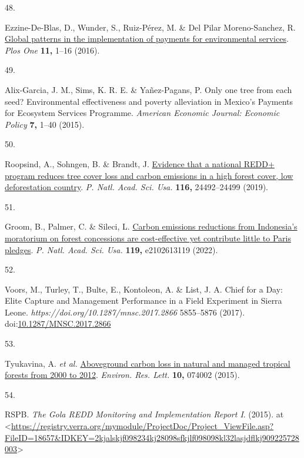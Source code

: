 \documentclass[
]{article}
\newlength{\cslhangindent}
\newlength{\csllabelwidth}
\newlength{\cslentryspacingunit} %
\newenvironment{CSLReferences}[2] %
 {%
  \setlength{\parindent}{0pt}
  \ifodd #1
  \let\oldpar\par
  \def\par{\hangindent=\cslhangindent\oldpar}
  \fi
  \setlength{\parskip}{#2\cslentryspacingunit}
 }%
 {}
\newcommand{\CSLLeftMargin}[1]{\parbox[t]{\csllabelwidth}{#1}}
\newcommand{\CSLRightInline}[1]{\parbox[t]{\linewidth - \csllabelwidth}{#1}\break}
\begin{document}
\begin{CSLReferences}{0}{0}
\leavevmode{}%
\CSLLeftMargin{48. }%
\CSLRightInline{Ezzine-De-Blas, D., Wunder, S., Ruiz-Pérez, M. \& Del
Pilar Moreno-Sanchez, R.
\href{https://doi.org/10.1371/journal.pone.0149847}{{Global patterns in
the implementation of payments for environmental services}}. \emph{Plos
One} \textbf{11,} 1--16 (2016).}

\leavevmode{}%
\CSLLeftMargin{49. }%
\CSLRightInline{Alix-Garcia, J. M., Sims, K. R. E. \& Yañez-Pagans, P.
{Only one tree from each seed? Environmental effectiveness and poverty
alleviation in Mexico's Payments for Ecosystem Services Programme}.
\emph{American Economic Journal: Economic Policy} \textbf{7,} 1--40
(2015).}

\leavevmode{}%
\CSLLeftMargin{50. }%
\CSLRightInline{Roopsind, A., Sohngen, B. \& Brandt, J.
\href{https://doi.org/10.1073/pnas.1904027116}{{Evidence that a national
REDD+ program reduces tree cover loss and carbon emissions in a high
forest cover, low deforestation country}}. \emph{P. Natl. Acad. Sci.
Usa.} \textbf{116,} 24492--24499 (2019).}

\leavevmode{}%
\CSLLeftMargin{51. }%
\CSLRightInline{Groom, B., Palmer, C. \& Sileci, L.
\href{https://doi.org/10.1073/PNAS.2102613119/SUPPL_FILE/PNAS.2102613119.SAPP.PDF}{{Carbon
emissions reductions from Indonesia's moratorium on forest concessions
are cost-effective yet contribute little to Paris pledges}}. \emph{P.
Natl. Acad. Sci. Usa.} \textbf{119,} e2102613119 (2022).}

\leavevmode{}%
\CSLLeftMargin{52. }%
\CSLRightInline{Voors, M., Turley, T., Bulte, E., Kontoleon, A. \& List,
J. A. {Chief for a Day: Elite Capture and Management Performance in a
Field Experiment in Sierra Leone}.
\emph{https://doi.org/10.1287/mnsc.2017.2866} 5855--5876 (2017).
doi:\href{https://doi.org/10.1287/MNSC.2017.2866}{10.1287/MNSC.2017.2866}}

\leavevmode{}%
\CSLLeftMargin{53. }%
\CSLRightInline{Tyukavina, A. \emph{et al.}
\href{https://doi.org/10.1088/1748-9326/10/7/074002}{{Aboveground carbon
loss in natural and managed tropical forests from 2000 to 2012}}.
\emph{Environ. Res. Lett.} \textbf{10,} 074002 (2015).}

\leavevmode{}%
\CSLLeftMargin{54. }%
\CSLRightInline{RSPB. \emph{{The Gola REDD Monitoring and Implementation
Report I}}. (2015). at
\textless{}\url{https://registry.verra.org/mymodule/ProjectDoc/Project_ViewFile.asp?FileID=18657\&IDKEY=2kjalskjf098234kj28098sfkjlf098098kl32lasjdflkj909225728003}\textgreater{}}

\end{CSLReferences}
\end{document}
